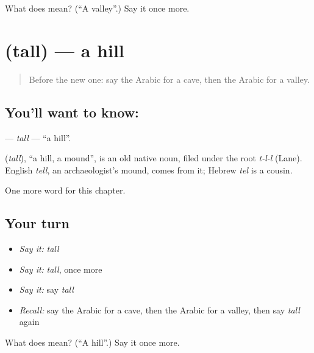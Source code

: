 \begin{tcolorbox}[breakable,colback=teal!4,colframe=teal!35!black,title={Before you move on}]
What does  mean? (\textquotedblleft{}A valley\textquotedblright{}.) Say it once more.
\end{tcolorbox}
\section[\texorpdfstring{\ar{تل} (tall)}{تل (tall)}]{ (tall) — a hill}

\label{lesson:AR-C132-tall}



\begin{quote}
Before the new one: say the Arabic for a cave, then the Arabic for a valley.
\end{quote}

\subsection*{You'll want to know: }
\textbf{} — \emph{tall} — \textquotedblleft{}a hill\textquotedblright{}.

\begin{cousinweb}
\textbf{} (\emph{tall}), \textquotedblleft{}a hill, a mound\textquotedblright{}, is an old native noun, filed under the root \emph{t-l-l} (Lane). English \emph{tell}, an archaeologist's mound, comes from it; Hebrew \emph{tel} is a cousin.
\end{cousinweb}

\begin{grammarlens}[title={What you've built}]
One more word for this chapter.
\end{grammarlens}

\subsection*{Your turn}
\begin{itemize}
\raggedright
  \item \emph{Say it:} \emph{tall}
  \item \emph{Say it:} \emph{tall}, once more
  \item \emph{Say it:} say \emph{tall}
  \item \emph{Recall:} say the Arabic for a cave, then the Arabic for a valley, then say \emph{tall} again
\end{itemize}

\begin{tcolorbox}[breakable,colback=teal!4,colframe=teal!35!black,title={Before you move on}]
What does  mean? (\textquotedblleft{}A hill\textquotedblright{}.) Say it once more.
\end{tcolorbox}
